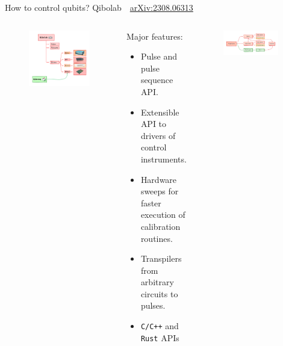 \documentclass[aspectratio=169, 10pt, xcolor={svgnames}, hyperref={linkcolor=black}]{beamer}
\begin{document}
\begin{frame}{How to control qubits? Qibolab  \hfill \faBook\,\, \href{https://arxiv.org/abs/2308.06313}{arXiv:2308.06313}}
   \small
   \begin{columns}
     \column{6.5cm}

   \begin{figure}
     \includegraphics[width=\textwidth]{figures/instruments.pdf}
   \end{figure}

     \column{9cm}
     \begin{alertblock}{Major features:}
       \begin{itemize}
         \item Pulse and pulse sequence API.
         \item Extensible API to drivers of control instruments.
         \item Hardware sweeps for faster execution of calibration routines.
         \item Transpilers from arbitrary circuits to pulses.
         \item \texttt{C/C++} and \texttt{Rust} APIs
       \end{itemize}
     \end{alertblock}
     \begin{figure}
       \includegraphics[width=0.9\textwidth]{figures/platform_object.pdf}
     \end{figure}
   \end{columns}

 \end{frame}
\end{document}
